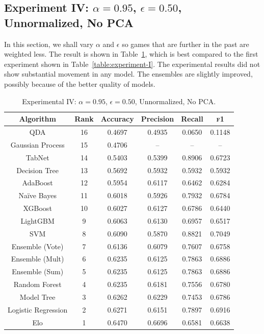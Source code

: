 \documentclass[10pt]{article}
\begin{document}
\subsection{Experiment IV: $\alpha=0.95$, $\epsilon = 0.50$, Unnormalized, No PCA}

In this section, we shall vary $\alpha$ and $\epsilon$ so games that are further
in the past are weighted less. The result is shown in Table~\ref{table:experiment-IV},
which is best compared to the first experiment shown in Table~\ref{table:experiment-I}.
The experimental results did not show substantial movement in any model. The ensembles
are slightly improved, possibly because of the better quality of models.

\begin{table}[htbp]
\centering
\begin{tabular}{|c|c|c|c|c|c|}
\hline
Algorithm & Rank & Accuracy & Precision & Recall & \textsc{f1} \\ \hline
 QDA & 16 & 0.4697 & 0.4935 & 0.0650 & 0.1148 \\
 Gaussian Process & 15 & 0.4706 & -- & -- & -- \\
 TabNet & 14 & 0.5403 & 0.5399 & 0.8906 & 0.6723 \\
 Decision Tree & 13 & 0.5692 & 0.5932 & 0.5932 & 0.5932 \\
 AdaBoost & 12 & 0.5954 & 0.6117 & 0.6462 & 0.6284 \\
 Na\"ive Bayes & 11 & 0.6018 & 0.5926 & 0.7932 & 0.6784 \\
 XGBoost & 10 & 0.6027 & 0.6127 & 0.6786 & 0.6440 \\
 LightGBM & 9 & 0.6063 & 0.6130 & 0.6957 & 0.6517 \\
 SVM & 8 & 0.6090 & 0.5870 & 0.8821 & 0.7049 \\
Ensemble (Vote) & 7 & 0.6136 & 0.6079 & 0.7607 & 0.6758 \\
Ensemble (Mult) & 6 & 0.6235 & 0.6125 & 0.7863 & 0.6886 \\
Ensemble (Sum) & 5 & 0.6235 & 0.6125 & 0.7863 & 0.6886 \\
 Random Forest & 4 & 0.6235 & 0.6181 & 0.7556 & 0.6780 \\
 Model Tree & 3 & 0.6262 & 0.6229 & 0.7453 & 0.6786 \\ \hline
 Logistic Regression & 2 & 0.6271 & 0.6151 & 0.7897 & 0.6916 \\ \hline
Elo & 1 & 0.6470 & 0.6696 & 0.6581 & 0.6638 \\
\hline
\end{tabular}
\caption{Experimental IV: $\alpha=0.95$, $\epsilon = 0.50$, Unnormalized, No PCA.}
\label{table:experiment-IV}
\end{table}
\end{document}
